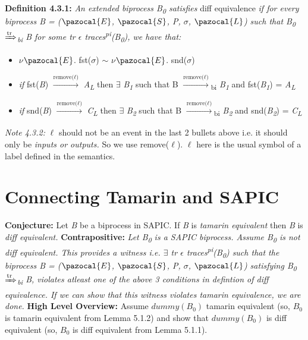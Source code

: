 \documentclass[11pt]{article}
\newcommand{\Sa}{\pazocal{S}}
\newcommand{\Lb}{\pazocal{L}}
\newcommand{\Ea}{\pazocal{E}}
\begin{document}
{\bf Definition 4.3.1: }{\it An extended biprocess B\textsubscript{0} satisfies} diff equivalence {\it if for every biprocess B = ($\Ea$, $\Sa$, P, $\sigma$, $\Lb$) such that B\textsubscript{0} {$\xRightarrow[\text{}]{\text{tr}}$}\textsubscript{bi} B for some tr $\epsilon$ traces\textsuperscript{pi}(B\textsubscript{0}), we have that:}
\begin{itemize}
  \vspace{-6pt}
  \item $\nu$$\Ea$. fst($\sigma$) $\sim$ $\nu$$\Ea$. snd($\sigma$)
  \vspace{-3pt}
  \item {\it if} fst({\it B}) {$\xrightarrow[\text{}]{\text{remove($\ell$)}}$} {\it A}\textsubscript{{\it L}} then {$\exists$} {\it B\textsubscript{1}} such that 
  B {$\xrightarrow[\text{}]{\text{remove($\ell$)}}$}{\textsubscript{bi}} {\it B\textsubscript{1}} and fst({\it B\textsubscript{1}}) = {\it A}\textsubscript{{\it L}}
  \vspace{-6pt}
  \item {\it if} snd({\it B}) {$\xrightarrow[\text{}]{\text{remove($\ell$)}}$} {\it C}\textsubscript{{\it L}} then {$\exists$} {\it B\textsubscript{2}} such that 
  B {$\xrightarrow[\text{}]{\text{remove($\ell$)}}$}{\textsubscript{bi}} {\it B\textsubscript{2}} and snd({\it B\textsubscript{2}}) = {\it C}\textsubscript{{\it L}}
\end{itemize}
\vspace{3pt}
{\it Note 4.3.2:} $\ell$ should not be an event in the last 2 bullets above i.e. it should only be {\it inputs or outputs.} So we use remove($\ell$). $\ell$ here is the usual symbol of a label defined in the semantics.
\vspace{3pt}

\section {Connecting Tamarin and SAPIC}
\vspace{8pt}
{\bf Conjecture:} Let {\it B} be a biprocess in SAPIC. If {\it B} is {\it tamarin equivalent} then {\it B} is {\it diff equivalent.}\newline\newline
{\bf Contrapositive: }{\it Let B\textsubscript{0} is a SAPIC biprocess. Assume B\textsubscript{0} is not diff equivalent. This provides a witness i.e. $\exists$ tr $\epsilon$ traces\textsuperscript{pi}(B\textsubscript{0}) such that the biprocess B = ($\Ea$, $\Sa$, P, $\sigma$, $\Lb$) satisfying B\textsubscript{0} {$\xRightarrow[\text{}]{\text{tr}}$}\textsubscript{bi} B, violates atleast one of the above 3 conditions in defintion of diff equivalence. If we can show that this witness violates tamarin equivalence, we are done.}\newline\newline
{\bf High Level Overview: }Assume $dummy(B_0)$ tamarin equivalent (so, $B_0$ is tamarin equivalent from Lemma 5.1.2) and show that $dummy(B_0)$ is diff equivalent (so, $B_0$ is diff equivalent from Lemma 5.1.1).
\end{document}
